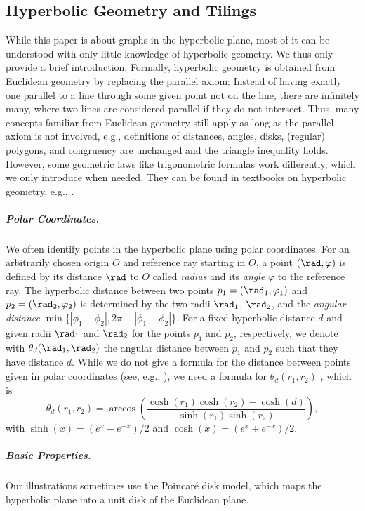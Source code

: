 \subsection{Hyperbolic Geometry and Tilings}
%
While this paper is about graphs in the hyperbolic plane, most of it can be understood with only little knowledge of hyperbolic geometry.
We thus only provide a brief introduction.
Formally, hyperbolic geometry is obtained from Euclidean geometry by replacing the parallel axiom: Instead of having exactly one parallel to a line through some given point not on the line, there are infinitely many, where two lines are considered parallel if they do not intersect.
Thus, many concepts familiar from Euclidean geometry still apply as long as the parallel axiom is not involved, e.g., definitions of distances, angles, disks, (regular) polygons, and congruency are unchanged and the triangle inequality holds.
However, some geometric laws like trigonometric formulas work differently,
which we only introduce when needed.
They can be found in textbooks on hyperbolic geometry, e.g., \cite{Euclid_Non_Euclid_Geomet-Green93}.
%
\subparagraph{Polar Coordinates.}
%
We often identify points in the hyperbolic plane using polar coordinates.
For an arbitrarily chosen origin $O$ and reference ray starting in $O$, a point $(\rad, \varphi)$ is defined by its distance $\rad$ to $O$ called \emph{radius} and its \emph{angle} $\varphi$ to the reference ray.
The hyperbolic distance between two points $p_1 = (\rad_1, \varphi_1)$ and $p_2 = (\rad_2, \varphi_2)$ is determined by the two radii $\rad_1$, $\rad_2$, and the \emph{angular distance} $\min\{|\phi_1 - \phi_2|, 2 \pi - |\phi_1 - \phi_2|\}$.
For a fixed hyperbolic distance $d$ and given radii $\rad_1$ and $\rad_2$ for the points $p_1$ and $p_2$, respectively, we denote with $\theta_d(\rad_1, \rad_2)$ the angular distance between $p_1$ and $p_2$ such that they have distance $d$.
While we do not give a formula for the distance between points given in polar coordinates (see, e.g., \cite{blasius_strongly_2023}), we need a formula for $\theta_d(r_1, r_2)$ , which is
%
\begin{equation}
    \label{eq:max_angular_distance}
    \theta_d(r_1,r_2) = \arccos\left(\frac{\cosh(r_1)\cosh(r_2)-\cosh(d)}{\sinh(r_1)\sinh(r_2)}\right),
\end{equation}
%
with $\sinh(x) = (e^x - e^{-x}) / 2$ and $\cosh(x) = (e^x + e^{-x}) / 2$.
%
\subparagraph{Basic Properties.}
%
Our illustrations sometimes use the Poincaré disk model, which maps the hyperbolic plane into a unit disk of the Euclidean plane.
